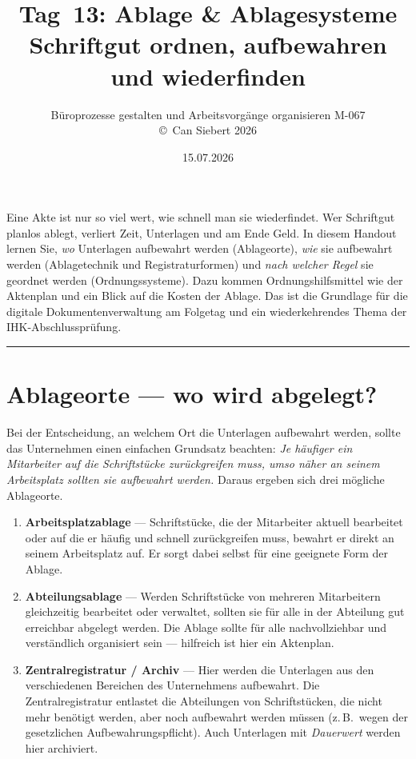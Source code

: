 \documentclass[11pt, a4paper]{article}
\title{\vspace*{-1.5cm}\Huge\bfseries\color{bfwPrimaryDark}Tag~13: Ablage \& Ablagesysteme\\[0.4em]
  \large\color{bfwInkSoft}\textnormal{Schriftgut ordnen, aufbewahren und wiederfinden}}
\author{\textsf{Büroprozesse gestalten und Arbeitsvorgänge organisieren \textperiodcentered{} M-067}\\
\textsf{\small\copyright\ Can Siebert\,\textperiodcentered\,2026}}
\date{15.07.2026}
\begin{document}
\maketitle
\thispagestyle{empty}

\vspace{1em}
\begin{merksatz}[title={\bfseries Worum geht es heute?}]
Eine Akte ist nur so viel wert, wie schnell man sie wiederfindet. Wer Schriftgut
planlos ablegt, verliert Zeit, Unterlagen und am Ende Geld. In diesem Handout lernen Sie,
\emph{wo} Unterlagen aufbewahrt werden (Ablageorte), \emph{wie} sie aufbewahrt werden
(Ablagetechnik und Registraturformen) und \emph{nach welcher Regel} sie geordnet werden
(Ordnungssysteme). Dazu kommen Ordnungshilfsmittel wie der Aktenplan und ein Blick auf
die Kosten der Ablage. Das ist die Grundlage für die digitale Dokumentenverwaltung am
Folgetag und ein wiederkehrendes Thema der IHK-Abschlussprüfung.
\end{merksatz}

\tableofcontents
\vspace{1em}
\hrule
\vspace{1em}

\section{Ablageorte --- wo wird abgelegt?}

Bei der Entscheidung, an welchem Ort die Unterlagen aufbewahrt werden, sollte das
Unternehmen einen einfachen Grundsatz beachten: \emph{Je häufiger ein Mitarbeiter auf
die Schriftstücke zurückgreifen muss, umso näher an seinem Arbeitsplatz sollten sie
aufbewahrt werden.} Daraus ergeben sich drei mögliche Ablageorte.

\begin{enumerate}
  \item \textbf{Arbeitsplatzablage} --- Schriftstücke, die der Mitarbeiter aktuell
    bearbeitet oder auf die er häufig und schnell zurückgreifen muss, bewahrt er direkt
    an seinem Arbeitsplatz auf. Er sorgt dabei selbst für eine geeignete Form der Ablage.
  \item \textbf{Abteilungsablage} --- Werden Schriftstücke von mehreren Mitarbeitern
    gleichzeitig bearbeitet oder verwaltet, sollten sie für alle in der Abteilung gut
    erreichbar abgelegt werden. Die Ablage sollte für alle nachvollziehbar und
    verständlich organisiert sein --- hilfreich ist hier ein Aktenplan.
  \item \textbf{Zentralregistratur / Archiv} --- Hier werden die Unterlagen aus den
    verschiedenen Bereichen des Unternehmens aufbewahrt. Die Zentralregistratur entlastet
    die Abteilungen von Schriftstücken, die nicht mehr benötigt werden, aber noch
    aufbewahrt werden müssen (z.\,B.\ wegen der gesetzlichen Aufbewahrungspflicht). Auch
    Unterlagen mit \emph{Dauerwert} werden hier archiviert.
\end{enumerate}
\end{document}
